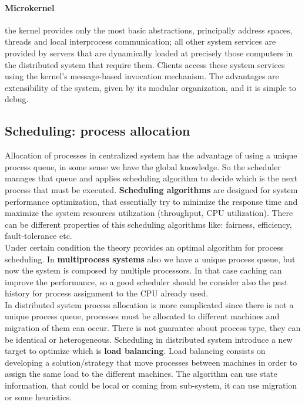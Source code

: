 \paragraph{Microkernel} the kernel provides only the most basic abstractions, principally address spaces, threads and local interprocess communication; all other system services are provided by servers that are dynamically loaded at precisely those computers in the distributed system that require them. Clients access these system services using the kernel’s message-based invocation mechanism. The advantages are extensibility of the system, given by its modular organization, and it is simple to debug.

\subsection{Scheduling: process allocation}
Allocation of processes in centralized system has the advantage of using a unique process queue, in some sense we have the global knowledge. So the scheduler manages that queue and applies scheduling algorithm to decide which is the next process that must be executed. \textbf{Scheduling algorithms} are designed for system performance optimization, that essentially try to minimize the response time and maximize the system resources utilization (throughput, CPU utilization). There can be different properties of this scheduling algorithms like: fairness, efficiency, fault-tolerance etc.\\
Under certain condition the theory provides an optimal algorithm for process scheduling. In \textbf{multiprocess systems} also we have a unique process queue, but now the system is composed by multiple processors. In that case caching can improve the performance, so a good scheduler should be consider also the past history for process assignment to the CPU already used.\\
In distributed system process allocation is more complicated since there is not a unique process queue, processes must be allocated to different machines and migration of them can occur. There is not guarantee about process type, they can be identical or heterogeneous. Scheduling in distributed system introduce a new target to optimize which is \textbf{load balancing}. Load balancing consists on developing a solution/strategy that move processes between machines in order to assign the same load to the different machines. The algorithm can use state information, that could be local or coming from sub-system, it can use migration or some heuristics.\\

